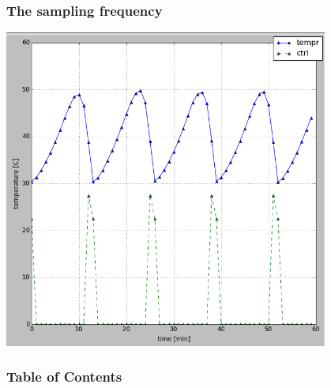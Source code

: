 \documentclass{beamer}
\begin{document}
\begin{frame}

\frametitle{The sampling frequency}
\includegraphics[width=0.8\textwidth]{../images/exp_relay_slow}~
\end{frame}

\begin{frame}
\frametitle{Table of Contents}
\tableofcontents
\end{frame}
\end{document}
